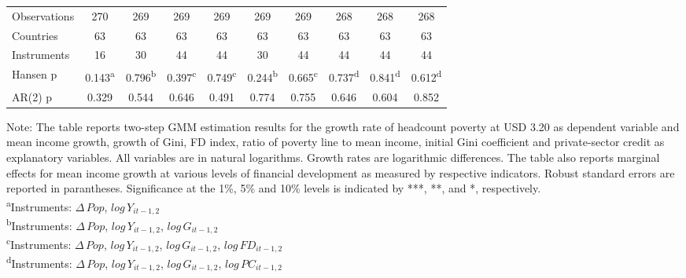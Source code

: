 \documentclass[12pt, a4paper]{article}
\begin{document}
\begin{table}[htbp]
\begin{threeparttable}
{\begin{tabular}{l*{9}{c}}
				
				\hline
				Observations        &         270         &         269         &         269         &         269         &         269         &         269         &         268         &         268         &         268         \\
				Countries           &          63         &          63         &          63         &          63         &          63         &          63         &          63         &          63         &          63         \\
				Instruments         &          16         &          30         &          44         &          44         &          30         &          44         &          44         &          44         &          44         \\
				Hansen p         &       0.143\textsuperscript{a}        &       0.796\textsuperscript{b}         &       0.397\textsuperscript{c}         &       0.749\textsuperscript{c}         &       0.244\textsuperscript{b}         &       0.665\textsuperscript{c}         &       0.737\textsuperscript{d}         &       0.841\textsuperscript{d}         &       0.612\textsuperscript{d}         \\
				AR(2) p               &       0.329         &       0.544         &       0.646         &       0.491         &       0.774         &       0.755         &       0.646         &       0.604         &       0.852         \\
				\hline\hline
			\end{tabular}
		}
		\begin{tablenotes}
			\item \scriptsize{Note: The table reports two-step GMM estimation results for the growth rate of headcount poverty at USD 3.20 as dependent variable and mean income growth, growth of Gini, FD index, ratio of poverty line to mean income, initial Gini coefficient and private-sector credit as explanatory variables. All variables are in natural logarithms. Growth rates are logarithmic differences. The table also reports marginal effects for mean income growth at various levels of financial development as measured by respective indicators. Robust standard errors are reported in parantheses. Significance at the 1\%, 5\% and 10\% levels is indicated by ***, **, and *, respectively.\\
				\textsuperscript{a}Instruments: $\Delta \, Pop$, $log \, Y_{it-1,2}$}\\
			\textsuperscript{b}Instruments: $\Delta \, Pop$, $log \, Y_{it-1,2}$, $log \, G_{it-1,2}$\\
			\textsuperscript{c}Instruments: $\Delta \, Pop$, $log \, Y_{it-1,2}$, $log \, G_{it-1,2}$, $log \, FD_{it-1,2}$\\
			\textsuperscript{d}Instruments: $\Delta \, Pop$, $log \, Y_{it-1,2}$, $log \, G_{it-1,2}$, $log \, PC_{it-1,2}$\\
			

\end{tablenotes}
\end{threeparttable}
\end{table}
\end{document}
